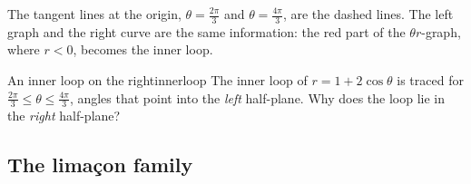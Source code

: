 \documentclass[11pt]{article}
\begin{document}
\begin{center}
\end{center}

The tangent lines at the origin, $\theta=\frac{2\pi}3$ and $\theta=\frac{4\pi}3$, are the dashed lines. The left graph and the right curve are the same information: the red part of the $\theta r$-graph, where $r<0$, becomes the inner loop.

\begin{think}{An inner loop on the right}{innerloop}
The inner loop of $r=1+2\cos\theta$ is traced for $\frac{2\pi}3\le\theta\le\frac{4\pi}3$, angles that point into the \emph{left} half-plane. Why does the loop lie in the \emph{right} half-plane?
\end{think}

\subsection*{The limaçon family}
\end{document}
